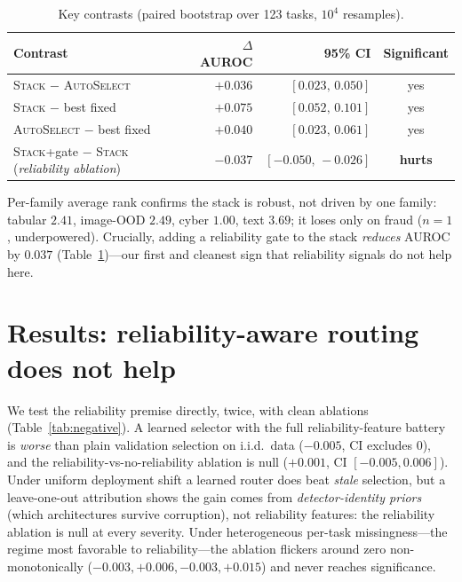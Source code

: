 \documentclass[11pt]{article}
\newcommand{\stack}{\textsc{Stack}}
\newcommand{\auto}{\textsc{AutoSelect}}
\begin{document}
\begin{table}[t]\centering
\caption{Key contrasts (paired bootstrap over 123 tasks, $10^4$ resamples).}
\label{tab:contrasts}
\begin{tabular}{lrrc}
\toprule
Contrast & $\Delta$AUROC & 95\% CI & Significant \\
\midrule
\stack{} $-$ \auto{}            & $+0.036$ & $[0.023,\,0.050]$ & yes \\
\stack{} $-$ best fixed         & $+0.075$ & $[0.052,\,0.101]$ & yes \\
\auto{} $-$ best fixed          & $+0.040$ & $[0.023,\,0.061]$ & yes \\
\stack{}+gate $-$ \stack{} (\emph{reliability ablation}) & $-0.037$ & $[-0.050,\,-0.026]$ & \textbf{hurts} \\
\bottomrule
\end{tabular}
\end{table}

Per-family average rank confirms the stack is robust, not driven by one family:
tabular $2.41$, image-OOD $2.49$, cyber $1.00$, text $3.69$; it loses only on fraud
($n{=}1$, underpowered). Crucially, adding a reliability gate to the stack
\emph{reduces} AUROC by $0.037$ (Table~\ref{tab:contrasts})---our first and cleanest
sign that reliability signals do not help here.

\section{Results: reliability-aware routing does not help}\label{sec:negative}
We test the reliability premise directly, twice, with clean ablations
(Table~\ref{tab:negative}). A learned selector with the full reliability-feature
battery is \emph{worse} than plain validation selection on i.i.d.\ data ($-0.005$, CI
excludes $0$), and the reliability-vs-no-reliability ablation is null ($+0.001$, CI
$[-0.005,0.006]$). Under uniform deployment shift a learned router does beat \emph{stale}
selection, but a leave-one-out attribution shows the gain comes from \emph{detector-identity
priors} (which architectures survive corruption), not reliability features: the
reliability ablation is null at every severity. Under heterogeneous per-task
missingness---the regime most favorable to reliability---the ablation flickers around
zero non-monotonically ($-0.003,+0.006,-0.003,+0.015$) and never reaches significance.
\end{document}
